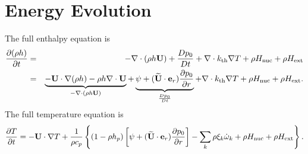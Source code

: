\section{Energy Evolution}
The full enthalpy equation is
\begin{eqnarray}
\frac{\partial(\rho h)}{\partial t} &=& -\nabla\cdot(\rho h {\bf U}) + \frac{Dp_0}{Dt} 
+ \nabla\cdot k_{\rm th} \nabla T + \rho H_{\rm nuc} + \rho H_{\rm ext} \nonumber \\
&=& \underbrace{-{\bf U}\cdot\nabla(\rho h) - \rho h\nabla\cdot{\bf U}}_{-\nabla\cdot(\rho h{\bf U})} 
+ \underbrace{\psi + (\widetilde{{\bf U}} \cdot \mathbf{e}_r) \frac{\partial p_0}{\partial r}}_{\frac{Dp_0}{Dt}} 
+ \nabla\cdot k_{\rm th}\nabla T + \rho H_{\rm nuc} + \rho H_{\rm ext}.
\end{eqnarray}
The full temperature equation is
\begin{equation}
\frac{\partial T}{\partial t} = -{\bf U}\cdot\nabla T
+ \frac{1}{\rho c_p}\left\{(1-\rho h_p)\left[\psi
+ (\widetilde{{\bf U}} \cdot \mathbf{e}_r )\frac{\partial p_0}{\partial r}\right] - \sum_k\rho\xi_k\dot\omega_k 
+ \rho H_{\rm nuc} + \rho H_{\rm ext}\right\}.
\end{equation}

